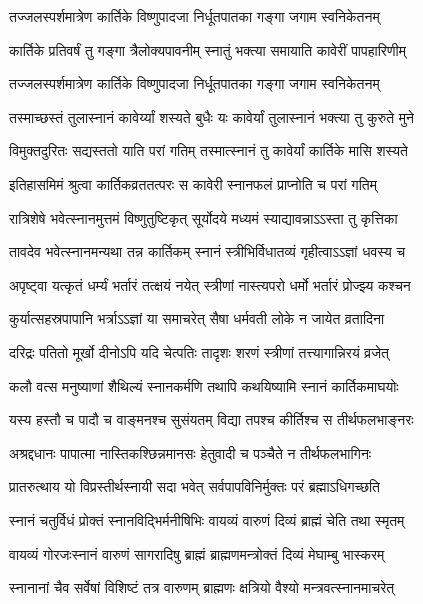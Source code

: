 \twolineshloka
{तज्जलस्पर्शमात्रेण कार्तिके विष्णुपादजा}
{निर्धूतपातका गङ्गा जगाम स्वनिकेतनम्} %

\twolineshloka
{कार्तिके प्रतिवर्षं तु गङ्गा त्रैलोक्यपावनीम्}
{स्नातुं भक्त्या समायाति कावेरीं पापहारिणीम्} %

\twolineshloka
{तज्जलस्पर्शमात्रेण कार्तिके विष्णुपादजा}
{निर्धूतपातका गङ्गा जगाम स्वनिकेतनम्} %

\twolineshloka
{तस्माच्छस्तं तुलास्नानं कावेर्य्यां शस्यते बुधैः}
{यः कावेर्यां तुलास्नानं भक्त्या तु कुरुते मुने} %

\twolineshloka
{विमुक्तदुरितः सद्यस्ततो याति परां गतिम्}
{तस्मात्स्नानं तु कावेर्यां कार्तिके मासि शस्यते} %

\twolineshloka
{इतिहासमिमं श्रुत्वा कार्तिकव्रततत्परः}
{स कावेरी स्नानफलं प्राप्नोति च परां गतिम्} %

\twolineshloka
{रात्रिशेषे भवेत्स्नानमुत्तमं विष्णुतुष्टिकृत्}
{सूर्योदये मध्यमं स्याद्यावन्नाऽऽस्ता तु कृत्तिका} %

\twolineshloka
{तावदेव भवेत्स्नानमन्यथा तन्न कार्तिकम्}
{स्नानं स्त्रीभिर्विधातव्यं गृहीत्वाऽऽज्ञां धवस्य च} %

\twolineshloka
{अपृष्ट्वा यत्कृतं धर्म्यं भर्तारं तत्क्षयं नयेत्}
{स्त्रीणां नास्त्यपरो धर्मो भर्तारं प्रोज्झ्य कश्चन} %

\twolineshloka
{कुर्यात्सहस्रपापानि भर्त्राऽऽज्ञां या समाचरेत्}
{सैषा धर्मवती लोके न जायेत व्रतादिना} %

\twolineshloka
{दरिद्रः पतितो मूर्खो दीनोऽपि यदि चेत्पतिः}
{तादृशः शरणं स्त्रीणां तत्त्यागान्निरयं व्रजेत्} %

\twolineshloka
{कलौ वत्स मनुष्याणां शैथिल्यं स्नानकर्मणि}
{तथापि कथयिष्यामि स्नानं कार्तिकमाघयोः} %

\twolineshloka
{यस्य हस्तौ च पादौ च वाङ्मनश्च सुसंयतम्}
{विद्या तपश्च कीर्तिश्च स तीर्थफलभाङ्नरः} %

\twolineshloka
{अश्रद्दधानः पापात्मा नास्तिकश्छिन्नमानसः}
{हेतुवादी च पञ्चैते न तीर्थफलभागिनः} %

\twolineshloka
{प्रातरुत्थाय यो विप्रस्तीर्थस्नायी सदा भवेत्}
{सर्वपापविनिर्मुक्तः परं ब्रह्माऽधिगच्छति} %

\twolineshloka
{स्नानं चतुर्विधं प्रोक्तं स्नानविद्भिर्मनीषिभिः}
{वायव्यं वारुणं दिव्यं ब्राह्मं चेति तथा स्मृतम्} %

\twolineshloka
{वायव्यं गोरजःस्नानं वारुणं सागरादिषु}
{ब्राह्मं ब्राह्मणमन्त्रोक्तं दिव्यं मेघाम्बु भास्करम्} %

\twolineshloka
{स्नानानां चैव सर्वेषां विशिष्टं तत्र वारुणम्}
{ब्राह्मणः क्षत्रियो वैश्यो मन्त्रवत्स्नानमाचरेत्} %


